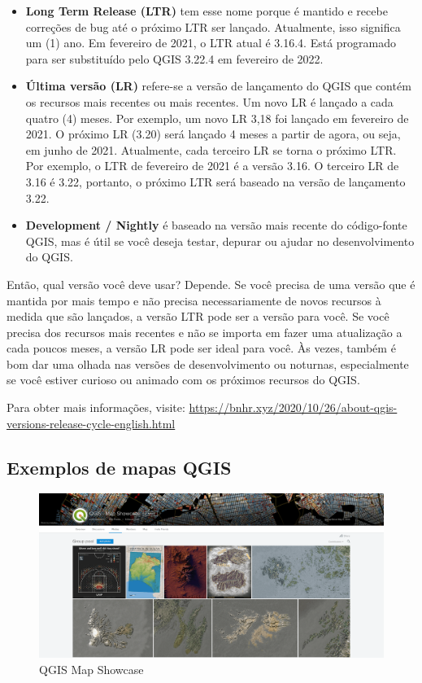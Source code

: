 \documentclass[
]{krantz}
\providecommand{\tightlist}{%
  \setlength{\itemsep}{0pt}\setlength{\parskip}{0pt}}
\begin{document}
\begin{itemize}
\tightlist
\item
  \textbf{Long Term Release (LTR)} tem esse nome porque é mantido e recebe correções de bug até o próximo LTR ser lançado. Atualmente, isso significa um (1) ano. Em fevereiro de 2021, o LTR atual é 3.16.4. Está programado para ser substituído pelo QGIS 3.22.4 em fevereiro de 2022.
\item
  \textbf{Última versão (LR)} refere-se a versão de lançamento do QGIS que contém os recursos mais recentes ou mais recentes. Um novo LR é lançado a cada quatro (4) meses. Por exemplo, um novo LR 3,18 foi lançado em fevereiro de 2021. O próximo LR (3.20) será lançado 4 meses a partir de agora, ou seja, em junho de 2021. Atualmente, cada terceiro LR se torna o próximo LTR. Por exemplo, o LTR de fevereiro de 2021 é a versão 3.16. O terceiro LR de 3.16 é 3.22, portanto, o próximo LTR será baseado na versão de lançamento 3.22.
\item
  \textbf{Development / Nightly} é baseado na versão mais recente do código-fonte QGIS, mas é útil se você deseja testar, depurar ou ajudar no desenvolvimento do QGIS.
\end{itemize}

Então, qual versão você deve usar? Depende. Se você precisa de uma versão que é mantida por mais tempo e não precisa necessariamente de novos recursos à medida que são lançados, a versão LTR pode ser a versão para você. Se você precisa dos recursos mais recentes e não se importa em fazer uma atualização a cada poucos meses, a versão LR pode ser ideal para você. Às vezes, também é bom dar uma olhada nas versões de desenvolvimento ou noturnas, especialmente se você estiver curioso ou animado com os próximos recursos do QGIS.

Para obter mais informações, visite: \href{https://bnhr.xyz/2020/10/26/\%20about-qgis-versions-release-cycle-english.html}{https://bnhr.xyz/2020/10/26/about-qgis-versions-release-cycle-english.html}

\hypertarget{exemplos-de-mapas-qgis}{%
\subsection{Exemplos de mapas QGIS}\label{exemplos-de-mapas-qgis}}

\begin{figure}
\centering
\includegraphics{media/modulo1/qgis-map-showcase.png}
\caption{QGIS Map Showcase}
\end{figure}
\end{document}
